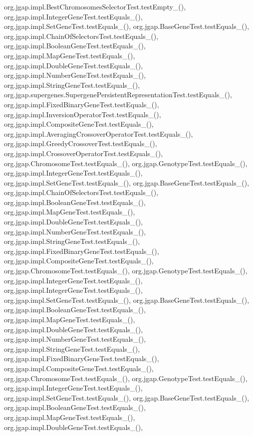 org.\-jgap.\-impl.\-Best\-Chromosomes\-Selector\-Test.\-test\-Empty\-\_(), org.\-jgap.\-impl.\-Integer\-Gene\-Test.\-test\-Equals\-\_(), org.\-jgap.\-impl.\-Set\-Gene\-Test.\-test\-Equals\-\_(), org.\-jgap.\-Base\-Gene\-Test.\-test\-Equals\-\_(), org.\-jgap.\-impl.\-Chain\-Of\-Selectors\-Test.\-test\-Equals\-\_(), org.\-jgap.\-impl.\-Boolean\-Gene\-Test.\-test\-Equals\-\_(), org.\-jgap.\-impl.\-Map\-Gene\-Test.\-test\-Equals\-\_(), org.\-jgap.\-impl.\-Double\-Gene\-Test.\-test\-Equals\-\_(), org.\-jgap.\-impl.\-Number\-Gene\-Test.\-test\-Equals\-\_(), org.\-jgap.\-impl.\-String\-Gene\-Test.\-test\-Equals\-\_(), org.\-jgap.\-supergenes.\-Supergene\-Persistent\-Representation\-Test.\-test\-Equals\-\_(), org.\-jgap.\-impl.\-Fixed\-Binary\-Gene\-Test.\-test\-Equals\-\_(), org.\-jgap.\-impl.\-Inversion\-Operator\-Test.\-test\-Equals\-\_(), org.\-jgap.\-impl.\-Composite\-Gene\-Test.\-test\-Equals\-\_(), org.\-jgap.\-impl.\-Averaging\-Crossover\-Operator\-Test.\-test\-Equals\-\_(), org.\-jgap.\-impl.\-Greedy\-Crossover\-Test.\-test\-Equals\-\_(), org.\-jgap.\-impl.\-Crossover\-Operator\-Test.\-test\-Equals\-\_(), org.\-jgap.\-Chromosome\-Test.\-test\-Equals\-\_(), org.\-jgap.\-Genotype\-Test.\-test\-Equals\-\_(), org.\-jgap.\-impl.\-Integer\-Gene\-Test.\-test\-Equals\-\_(), org.\-jgap.\-impl.\-Set\-Gene\-Test.\-test\-Equals\-\_(), org.\-jgap.\-Base\-Gene\-Test.\-test\-Equals\-\_(), org.\-jgap.\-impl.\-Chain\-Of\-Selectors\-Test.\-test\-Equals\-\_(), org.\-jgap.\-impl.\-Boolean\-Gene\-Test.\-test\-Equals\-\_(), org.\-jgap.\-impl.\-Map\-Gene\-Test.\-test\-Equals\-\_(), org.\-jgap.\-impl.\-Double\-Gene\-Test.\-test\-Equals\-\_(), org.\-jgap.\-impl.\-Number\-Gene\-Test.\-test\-Equals\-\_(), org.\-jgap.\-impl.\-String\-Gene\-Test.\-test\-Equals\-\_(), org.\-jgap.\-impl.\-Fixed\-Binary\-Gene\-Test.\-test\-Equals\-\_(), org.\-jgap.\-impl.\-Composite\-Gene\-Test.\-test\-Equals\-\_(), org.\-jgap.\-Chromosome\-Test.\-test\-Equals\-\_(), org.\-jgap.\-Genotype\-Test.\-test\-Equals\-\_(), org.\-jgap.\-impl.\-Integer\-Gene\-Test.\-test\-Equals\-\_(), org.\-jgap.\-impl.\-Integer\-Gene\-Test.\-test\-Equals\-\_(), org.\-jgap.\-impl.\-Set\-Gene\-Test.\-test\-Equals\-\_(), org.\-jgap.\-Base\-Gene\-Test.\-test\-Equals\-\_(), org.\-jgap.\-impl.\-Boolean\-Gene\-Test.\-test\-Equals\-\_(), org.\-jgap.\-impl.\-Map\-Gene\-Test.\-test\-Equals\-\_(), org.\-jgap.\-impl.\-Double\-Gene\-Test.\-test\-Equals\-\_(), org.\-jgap.\-impl.\-Number\-Gene\-Test.\-test\-Equals\-\_(), org.\-jgap.\-impl.\-String\-Gene\-Test.\-test\-Equals\-\_(), org.\-jgap.\-impl.\-Fixed\-Binary\-Gene\-Test.\-test\-Equals\-\_(), org.\-jgap.\-impl.\-Composite\-Gene\-Test.\-test\-Equals\-\_(), org.\-jgap.\-Chromosome\-Test.\-test\-Equals\-\_(), org.\-jgap.\-Genotype\-Test.\-test\-Equals\-\_(), org.\-jgap.\-impl.\-Integer\-Gene\-Test.\-test\-Equals\-\_(), org.\-jgap.\-impl.\-Set\-Gene\-Test.\-test\-Equals\-\_(), org.\-jgap.\-Base\-Gene\-Test.\-test\-Equals\-\_(), org.\-jgap.\-impl.\-Boolean\-Gene\-Test.\-test\-Equals\-\_(), org.\-jgap.\-impl.\-Map\-Gene\-Test.\-test\-Equals\-\_(), org.\-jgap.\-impl.\-Double\-Gene\-Test.\-test\-Equals\-\_(), 